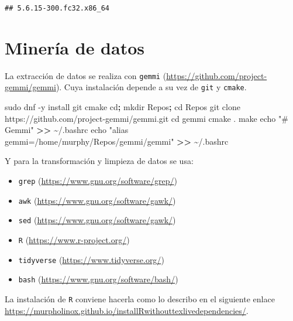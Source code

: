 \documentclass[
]{book}
\newenvironment{Shaded}{\begin{snugshade}}{\end{snugshade}}
\newcommand{\BuiltInTok}[1]{#1}
\newcommand{\FunctionTok}[1]{\textcolor[rgb]{0.00,0.00,0.00}{#1}}
\newcommand{\KeywordTok}[1]{\textcolor[rgb]{0.13,0.29,0.53}{\textbf{#1}}}
\newcommand{\NormalTok}[1]{#1}
\newcommand{\OperatorTok}[1]{\textcolor[rgb]{0.81,0.36,0.00}{\textbf{#1}}}
\newcommand{\StringTok}[1]{\textcolor[rgb]{0.31,0.60,0.02}{#1}}
\providecommand{\tightlist}{%
  \setlength{\itemsep}{0pt}\setlength{\parskip}{0pt}}
\begin{document}
\begin{verbatim}
## 5.6.15-300.fc32.x86_64
\end{verbatim}

\hypertarget{mineruxeda-de-datos}{%
\section{Minería de datos}\label{mineruxeda-de-datos}}

La extracción de datos se realiza con \texttt{gemmi} (\url{https://github.com/project-gemmi/gemmi}). Cuya instalación depende a su vez de \texttt{git} y \texttt{cmake}.

\begin{Shaded}
\begin{Highlighting}[]
\FunctionTok{sudo}\NormalTok{ dnf {-}y install git cmake}
\BuiltInTok{cd}\KeywordTok{;} \FunctionTok{mkdir}\NormalTok{ Repos}\KeywordTok{;} \BuiltInTok{cd}\NormalTok{ Repos}
\FunctionTok{git}\NormalTok{ clone https://github.com/project{-}gemmi/gemmi.git}
\BuiltInTok{cd}\NormalTok{ gemmi}
\FunctionTok{cmake}\NormalTok{ .}
\FunctionTok{make}
\BuiltInTok{echo} \StringTok{"\# Gemmi"} \OperatorTok{\textgreater{}\textgreater{}}\NormalTok{ \textasciitilde{}/.bashrc}
\BuiltInTok{echo} \StringTok{"alias gemmi=\textquotesingle{}/home/murphy/Repos/gemmi/gemmi\textquotesingle{}"} \OperatorTok{\textgreater{}\textgreater{}}\NormalTok{ \textasciitilde{}/.bashrc}
\end{Highlighting}
\end{Shaded}

Y para la transformación y limpieza de datos se usa:

\begin{itemize}
\tightlist
\item
  \texttt{grep} (\url{https://www.gnu.org/software/grep/})
\item
  \texttt{awk} (\url{https://www.gnu.org/software/gawk/})
\item
  \texttt{sed} (\url{https://www.gnu.org/software/gawk/})
\item
  \texttt{R} (\url{https://www.r-project.org/})
\item
  \texttt{tidyverse} (\url{https://www.tidyverse.org/})
\item
  \texttt{bash} (\url{https://www.gnu.org/software/bash/})
\end{itemize}

La instalación de \texttt{R} conviene hacerla como lo describo en el siguiente enlace \url{https://murpholinox.github.io/installRwithouttexlivedependencies/}.
\end{document}
